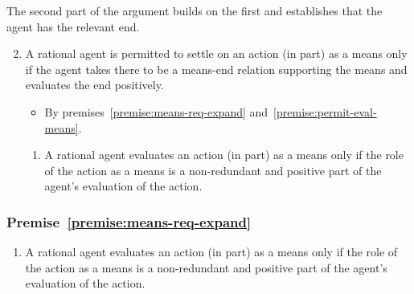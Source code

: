 \documentclass[10pt]{article}
\newcommand{\hozlinedash}[0]{%
  \noindent\hdashrule[0.5ex][c]{\textwidth}{.1pt}{2.5pt}
}
\begin{document}
The second part of the argument builds on the first and establishes that the agent has the relevant end.

\begin{enumerate}[label=P\arabic*., ref=(P\arabic*)]
  \setcounter{enumi}{1}
\item A rational agent is permitted to settle on an action (in part) as a means only if the agent takes there to be a means-end relation supporting the means and evaluates the end positively.
  \begin{itemize}
  \item By premises~\ref{premise:means-req-expand} and~\ref{premise:permit-eval-means}.
  \end{itemize}
  \begin{enumerate}[label=P\arabic{enumi}\alph*., ref=(P\arabic{enumi}\alph*)]
  \item\label{premise:means-req-expand} A rational agent evaluates an action (in part) as a means only if the role of the action as a means is a non-redundant and positive part of the agent’s evaluation of the action.
  \end{enumerate}
\end{enumerate}



\subsubsection{Premise~\ref{premise:means-req-expand}}
\label{sec:premise}


\hozlinedash

\begin{enumerate}[label=P\arabic{enumi}\alph*., ref=(P\arabic{enumi}\alph*)]
\item A rational agent evaluates an action (in part) as a means only if the role of the action as a means is a non-redundant and positive part of the agent’s evaluation of the action.
\end{enumerate}
\end{document}
